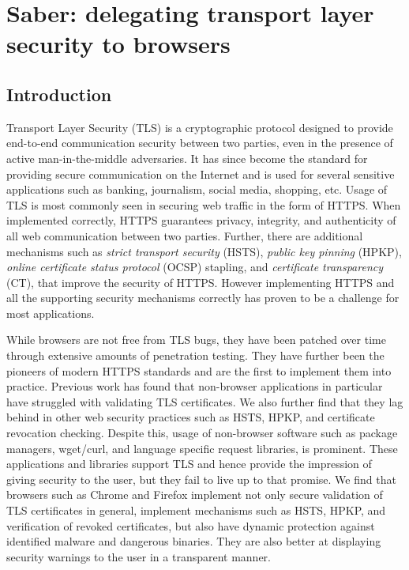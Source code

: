 \chapter{Saber: delegating transport layer security to browsers}

\section{Introduction}
\label{sec:intro-saber}

Transport Layer Security (TLS) is a cryptographic protocol designed to provide
end-to-end communication security between two parties, even in the presence of
active man-in-the-middle adversaries. It has since become the standard for
providing secure communication on the Internet and is used for several
sensitive applications such as banking, journalism, social media, shopping,
etc. Usage of TLS is most commonly seen in securing web traffic in the form of
HTTPS. When implemented correctly, HTTPS guarantees privacy, integrity, and
authenticity of all web communication between two parties. Further, there are
additional mechanisms such as \emph{strict transport security} (HSTS),
\emph{public key pinning} (HPKP), \emph{online certificate status protocol}
(OCSP) stapling, and \emph{certificate transparency} (CT), that improve the
security of HTTPS. However implementing HTTPS and all the supporting security
mechanisms correctly has proven to be a challenge for most applications.

While browsers are not free from TLS bugs, they have been patched over time
through extensive amounts of penetration testing. They have further been the
pioneers of modern HTTPS standards and are the first to implement them into
practice. Previous work has found that non-browser applications in particular
have struggled with validating TLS certificates\cite{dangerous}. We also
further find that they lag behind in other web security practices such as HSTS,
HPKP, and certificate revocation checking. Despite this, usage of non-browser
software such as package managers, wget/curl, and language specific request
libraries, is prominent. These applications and libraries support TLS and hence
provide the impression of giving security to the user, but they fail to live up
to that promise. We find that browsers such as Chrome and Firefox implement not
only secure validation of TLS certificates in general, implement mechanisms
such as HSTS, HPKP, and verification of revoked certificates, but also have
dynamic protection against identified malware and dangerous binaries. They are
also better at displaying security warnings to the user in a transparent
manner.

